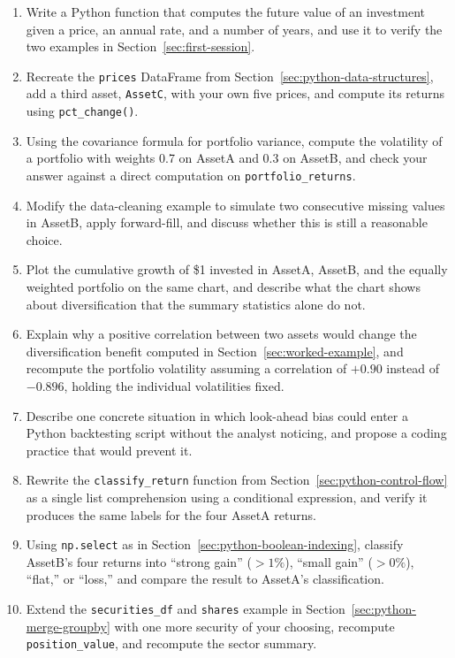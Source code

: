 \documentclass[../ai_in_finance]{subfiles}
\begin{document}

\begin{enumerate}[exercises]
    \item Write a Python function that computes the future value of an investment given a price, an annual rate, and a number of years, and use it to verify the two examples in Section~\ref{sec:first-session}.
    \item Recreate the \texttt{prices} DataFrame from Section~\ref{sec:python-data-structures}, add a third asset, \texttt{AssetC}, with your own five prices, and compute its returns using \texttt{pct\_change()}.
    \item\label{ex:python-portfolio-vol} Using the covariance formula for portfolio variance, compute the volatility of a portfolio with weights 0.7 on AssetA and 0.3 on AssetB, and check your answer against a direct computation on \texttt{portfolio\_returns}.
    \item Modify the data-cleaning example to simulate two consecutive missing values in AssetB, apply forward-fill, and discuss whether this is still a reasonable choice.
    \item Plot the cumulative growth of \$1 invested in AssetA, AssetB, and the equally weighted portfolio on the same chart, and describe what the chart shows about diversification that the summary statistics alone do not.
    \item Explain why a positive correlation between two assets would change the diversification benefit computed in Section~\ref{sec:worked-example}, and recompute the portfolio volatility assuming a correlation of $+0.90$ instead of $-0.896$, holding the individual volatilities fixed.
    \item Describe one concrete situation in which look-ahead bias could enter a Python backtesting script without the analyst noticing, and propose a coding practice that would prevent it.
    \item Rewrite the \texttt{classify\_return} function from Section~\ref{sec:python-control-flow} as a single list comprehension using a conditional expression, and verify it produces the same labels for the four AssetA returns.
    \item Using \texttt{np.select} as in Section~\ref{sec:python-boolean-indexing}, classify AssetB's four returns into ``strong gain'' ($>1\%$), ``small gain'' ($>0\%$), ``flat,'' or ``loss,'' and compare the result to AssetA's classification.
    \item Extend the \texttt{securities\_df} and \texttt{shares} example in Section~\ref{sec:python-merge-groupby} with one more security of your choosing, recompute \texttt{position\_value}, and recompute the sector summary.

\end{enumerate}
\end{document}
